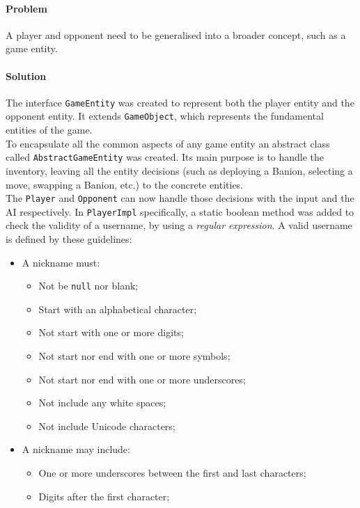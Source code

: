 \documentclass[12pt, a4paper]{report}
\theoremstyle{definition}
\begin{document}
    \paragraph{Problem}
    A player and opponent need to be generalised into a broader concept, such as a game entity.
    \paragraph{Solution}
    The interface \verb|GameEntity| was created to represent both the player entity and the opponent entity.
    It extends \verb|GameObject|, which represents the fundamental entities of the game.\\
    To encapsulate all the common aspects of any game entity an abstract class called \verb|AbstractGameEntity| was created. Its main purpose is to handle the inventory, leaving all the
    entity decisions (such as deploying a Banion, selecting a move, swapping a Banion, etc.) to the concrete entities.\\
    The \verb|Player| and \verb|Opponent| can now handle those decisions with the input and the AI respectively.
    In \verb|PlayerImpl| specifically, a static boolean method was added to check the validity of a username, by using a \textit{regular expression}.
    A valid username is defined by these guidelines:

    \begin{itemize}
        \item A nickname must:
        \begin{itemize}
            \item Not be \verb|null| nor blank;
            \item Start with an alphabetical character;
            \item Not start with one or more digits;
            \item Not start nor end with one or more symbols;
            \item Not start nor end with one or more underscores;
            \item Not include any white spaces;
            \item Not include Unicode characters;
        \end{itemize}
        \item A nickname may include:
        \begin{itemize}
            \item One or more underscores between the first and last characters;
            \item Digits after the first character;
        \end{itemize}
    \end{itemize}
\end{document}
